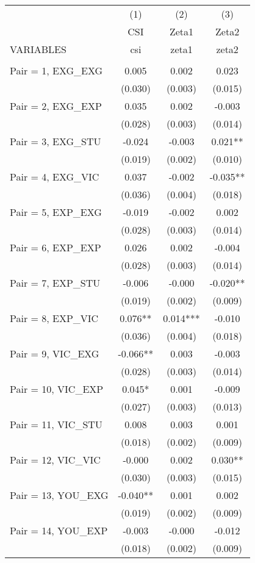 \documentclass[]{article}
\begin{document}
\begin{tabular}{lccc} \hline
 & (1) & (2) & (3) \\
 & CSI & Zeta1 & Zeta2 \\
VARIABLES & csi & zeta1 & zeta2 \\ \hline
 &  &  &  \\
Pair = 1, EXG\_EXG & 0.005 & 0.002 & 0.023 \\
 & (0.030) & (0.003) & (0.015) \\
Pair = 2, EXG\_EXP & 0.035 & 0.002 & -0.003 \\
 & (0.028) & (0.003) & (0.014) \\
Pair = 3, EXG\_STU & -0.024 & -0.003 & 0.021** \\
 & (0.019) & (0.002) & (0.010) \\
Pair = 4, EXG\_VIC & 0.037 & -0.002 & -0.035** \\
 & (0.036) & (0.004) & (0.018) \\
Pair = 5, EXP\_EXG & -0.019 & -0.002 & 0.002 \\
 & (0.028) & (0.003) & (0.014) \\
Pair = 6, EXP\_EXP & 0.026 & 0.002 & -0.004 \\
 & (0.028) & (0.003) & (0.014) \\
Pair = 7, EXP\_STU & -0.006 & -0.000 & -0.020** \\
 & (0.019) & (0.002) & (0.009) \\
Pair = 8, EXP\_VIC & 0.076** & 0.014*** & -0.010 \\
 & (0.036) & (0.004) & (0.018) \\
Pair = 9, VIC\_EXG & -0.066** & 0.003 & -0.003 \\
 & (0.028) & (0.003) & (0.014) \\
Pair = 10, VIC\_EXP & 0.045* & 0.001 & -0.009 \\
 & (0.027) & (0.003) & (0.013) \\
Pair = 11, VIC\_STU & 0.008 & 0.003 & 0.001 \\
 & (0.018) & (0.002) & (0.009) \\
Pair = 12, VIC\_VIC & -0.000 & 0.002 & 0.030** \\
 & (0.030) & (0.003) & (0.015) \\
Pair = 13, YOU\_EXG & -0.040** & 0.001 & 0.002 \\
 & (0.019) & (0.002) & (0.009) \\
Pair = 14, YOU\_EXP & -0.003 & -0.000 & -0.012 \\
 & (0.018) & (0.002) & (0.009) \\

\end{tabular}
\end{document}

